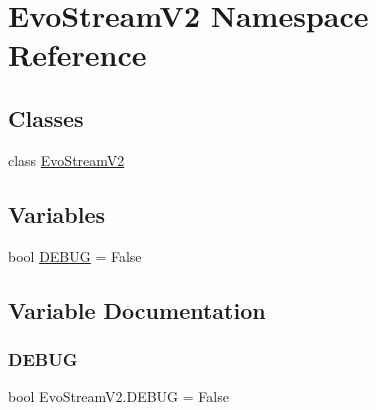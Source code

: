 \hypertarget{namespaceEvoStreamV2}{}\section{Evo\+Stream\+V2 Namespace Reference}
\label{namespaceEvoStreamV2}
\subsection*{Classes}
\begin{DoxyCompactItemize}
\item 
class \hyperlink{classEvoStreamV2_1_1EvoStreamV2}{Evo\+Stream\+V2}
\end{DoxyCompactItemize}
\subsection*{Variables}
\begin{DoxyCompactItemize}
\item 
bool \hyperlink{namespaceEvoStreamV2_aa3d9e3e3ca7aad3890a0b605375a2e7b}{D\+E\+B\+UG} = False
\end{DoxyCompactItemize}


\subsection{Variable Documentation}
\mbox{\label{namespaceEvoStreamV2_aa3d9e3e3ca7aad3890a0b605375a2e7b}} 
\subsubsection{\texorpdfstring{D\+E\+B\+UG}{DEBUG}}
{\footnotesize\ttfamily bool Evo\+Stream\+V2.\+D\+E\+B\+UG = False}


